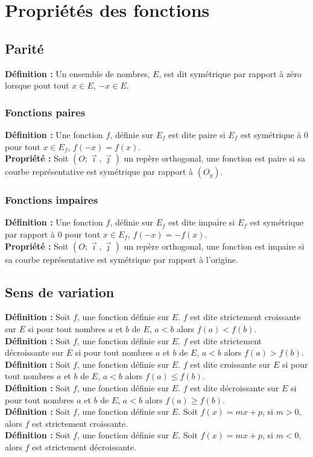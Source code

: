 \documentclass[a4paper,titlepage]{article}
\let\oldsection\section
\renewcommand\section{\clearpage\oldsection}
\begin{document}
\section{Propriétés des fonctions}
    \subsection{Parité}
        \textbf{Définition :} Un ensemble de nombres, $E$, est dit symétrique par rapport à zéro lorsque pout tout $x\in E$, $-x\in E$.
    \subsubsection{Fonctions paires}
        \textbf{Définition :} Une fonction $f$, définie sur $E_{f}$ est dite paire si $E_{f}$ est symétrique à $0$ pour tout $x\in E_{f}$, $f\left(-x\right)=f\left(x\right)$.
        \\
        \textbf{Propriété :} Soit $\left(O;\vec{\imath},\vec{\jmath}\right)$ un repère orthogonal, une fonction est paire si sa courbe représentative est symétrique par rapport à $\left(O_{y}\right)$.
    \subsubsection{Fonctions impaires}
        \textbf{Définition :} Une fonction $f$, définie sur $E_{f}$ est dite impaire si $E_{f}$ est symétrique par rapport à $0$ pour tout $x\in E_{f}$, $f\left(-x\right)=-f\left(x\right)$.
        \\
        \textbf{Propriété :} Soit $\left(O;\vec{\imath},\vec{\jmath}\right)$ un repère orthogonal, une fonction est impaire si sa courbe représentative est symétrique par rapport à l’origine.
    \subsection{Sens de variation}
        \textbf{Définition :} Soit $f$, une fonction définie sur $E$. $f$ est dite strictement croissante sur $E$ si pour tout nombres $a$ et $b$ de $E$, $a<b$ alors $f\left(a\right)<f\left(b\right)$.
        \\
        \textbf{Définition :} Soit $f$, une fonction définie sur $E$. $f$ est dite strictement dé\-crois\-sante sur $E$ si pour tout nombres $a$ et $b$ de $E$, $a<b$ alors $f\left(a\right)>f\left(b\right)$.
        \\
        \textbf{Définition :} Soit $f$, une fonction définie sur $E$. $f$ est dite croissante sur $E$ si pour tout nombres $a$ et $b$ de $E$, $a<b$ alors $f\left(a\right)\leqslant f\left(b\right)$.
        \\
        \textbf{Définition :} Soit $f$, une fonction définie sur $E$. $f$ est dite décroissante sur $E$ si pour tout nombres $a$ et $b$ de $E$, $a<b$ alors $f\left(a\right)\geqslant f\left(b\right)$.
        \\
        \textbf{Définition :} Soit $f$, une fonction définie sur $E$. Soit $f\left(x\right)=mx+p$, si $m>0$, alors $f$ est strictement croissante.
        \\
        \textbf{Définition :} Soit $f$, une fonction définie sur $E$. Soit $f\left(x\right)=mx+p$, si $m<0$, alors $f$ est strictement décroissante.
\end{document}
